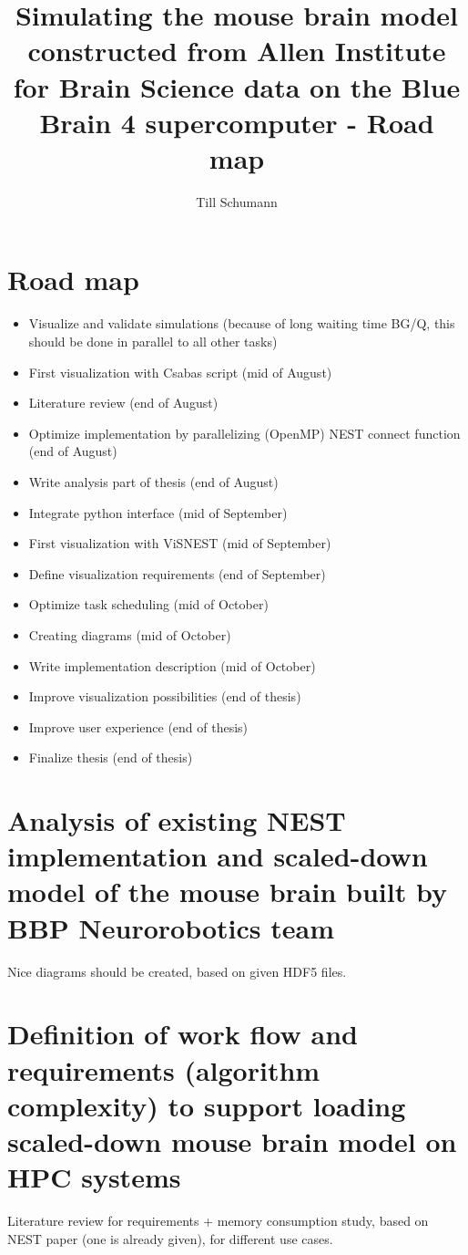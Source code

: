 \documentclass[a4paper]{article}
\title{ Simulating the mouse brain model constructed from Allen Institute for Brain Science data on the Blue Brain 4 supercomputer - Road map }
\author{Till Schumann}
\begin{document}
   \maketitle

\section{Road map}
\begin{itemize}
\item Visualize and validate simulations (because of long waiting time BG/Q, this should be done in parallel to all other tasks)
\item First visualization with Csabas script (mid of August)
\item Literature review (end of August)
\item Optimize implementation by parallelizing (OpenMP) NEST connect function (end of August)
\item Write analysis part of thesis (end of August)
\item Integrate python interface (mid of September)
\item First visualization with ViSNEST (mid of September)
\item Define visualization requirements (end of September)
\item Optimize task scheduling (mid of October)
\item Creating diagrams (mid of October)
\item Write implementation description (mid of October)
\item Improve visualization possibilities (end of thesis)
\item Improve user experience (end of thesis)
\item Finalize thesis (end of thesis)

\end{itemize}


\section{Analysis of existing NEST implementation and scaled-down model of the mouse brain built by BBP Neurorobotics team}
Nice diagrams should be created, based on given HDF5 files.
\section{Definition of work flow and requirements (algorithm complexity) to support loading scaled-down mouse brain model on HPC systems}
Literature review for requirements + memory consumption study, based on NEST paper (one is already given), for different use cases.
\end{document}
